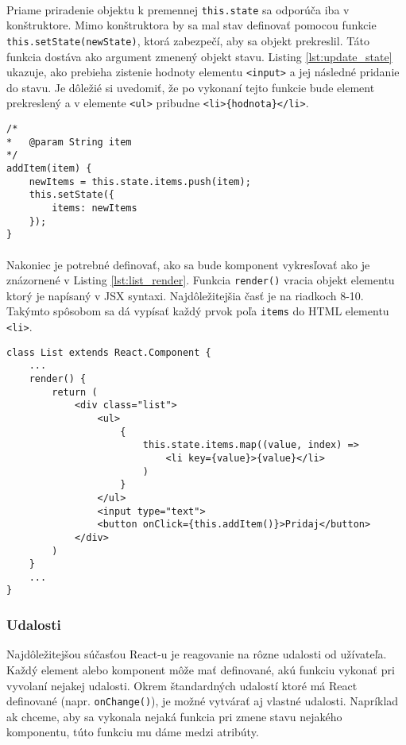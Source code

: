 \paragraph{}
Priame priradenie objektu k premennej \texttt{this.state} sa odporúča iba v konštruktore. Mimo konštruktora by sa mal stav definovať pomocou funkcie \texttt{this.setState(newState)}, ktorá zabezpečí, aby sa objekt prekreslil. Táto funkcia dostáva ako argument zmenený objekt stavu. Listing \ref{lst:update_state} ukazuje, ako prebieha zistenie hodnoty elementu \texttt{<input>} a jej následné pridanie do stavu. Je dôležié si uvedomiť, že po vykonaní tejto funkcie bude element prekreslený a v elemente \texttt{<ul>} pribudne \texttt{<li>\{hodnota\}</li>}.

\begin{lstlisting}[caption={Zmena stavu komponentu pomocou funkcie \texttt{this.setState()}},label={lst:update_state}]
/*
*	@param String item
*/
addItem(item) {
	newItems = this.state.items.push(item);
	this.setState({
		items: newItems
	});
}
\end{lstlisting}
\paragraph{}
Nakoniec je potrebné definovať, ako sa bude komponent vykresľovať ako je znázornené v Listing \ref{lst:list_render}. Funkcia \texttt{render()} vracia objekt elementu ktorý je napísaný v JSX syntaxi. Najdôležitejšia časť je na riadkoch 8-10. Takýmto spôsobom sa dá vypísať každý prvok poľa \texttt{items} do HTML elementu \texttt{<li>}.
\begin{lstlisting}[caption={Vykresľovanie komponentu \texttt{List}},label={lst:list_render}]
class List extends React.Component {
	...
	render() {
		return (
			<div class="list">
				<ul>
					{
						this.state.items.map((value, index) => 
							<li key={value}>{value}</li>					
						)				
					}
				</ul>
				<input type="text">
				<button onClick={this.addItem()}>Pridaj</button>
			</div>	
		)
	}
	...
} 
\end{lstlisting}

\subsubsection{Udalosti}
Najdôležitejšou súčasťou React-u je reagovanie na rôzne udalosti od užívateľa. Každý element alebo komponent môže mať definované, akú funkciu vykonať pri vyvolaní nejakej udalosti. Okrem štandardných udalostí ktoré má React definované (napr. \texttt{onChange()}), je možné vytvárať aj vlastné udalosti. Napríklad ak chceme, aby sa vykonala nejaká funkcia pri zmene stavu nejakého komponentu, túto funkciu mu dáme medzi atribúty.
